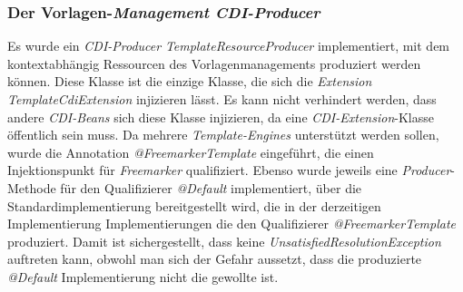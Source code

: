 \subsubsection{Der Vorlagen-\emph{Management CDI-Producer}}
Es wurde ein \emph{CDI-Producer} \emph{TemplateResourceProducer} implementiert, mit dem kontextabhängig Ressourcen des Vorlagenmanagements produziert werden können. Diese Klasse ist die einzige Klasse, die sich die \emph{Extension TemplateCdiExtension} injizieren lässt. Es kann nicht verhindert werden, dass andere \emph{CDI-Beans} sich diese Klasse injizieren, da eine \emph{CDI-Extension}-Klasse öffentlich sein muss. Da mehrere \emph{Template-Engines} unterstützt werden sollen, wurde die Annotation \emph{@FreemarkerTemplate} eingeführt, die einen Injektionspunkt für \emph{Freemarker} qualifiziert. Ebenso wurde jeweils eine \emph{Producer}-Methode für den Qualifizierer \emph{@Default} implementiert, über die Standardimplementierung bereitgestellt wird, die in der derzeitigen Implementierung Implementierungen die den Qualifizierer \emph{@FreemarkerTemplate} produziert. Damit ist sichergestellt, dass keine \emph{UnsatisfiedResolutionException} auftreten kann, obwohl man sich der Gefahr aussetzt, dass die produzierte \emph{@Default} Implementierung nicht die gewollte ist.
\newline
\newline








